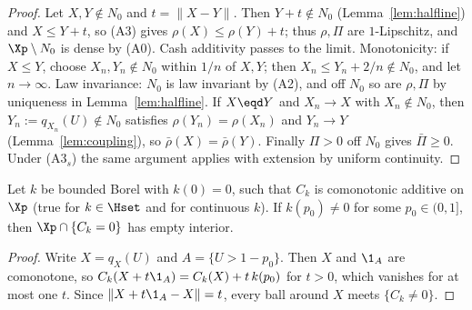 \begin{proof}
Let $X,Y\notin N_0$ and $t=\|X-Y\|$. Then $Y+t\notin N_0$ (Lemma~\ref{lem:halfline}) and $X\le Y+t$, so (A3) gives
$\rho(X)\le\rho(Y)+t$; thus $\rho,\Pi$ are $1$-Lipschitz, and $\Xp\setminus N_0$ is dense by (A0). Cash additivity
passes to the limit. Monotonicity: if $X\le Y$, choose $X_n,Y_n\notin N_0$ within $1/n$ of $X,Y$; then
$X_n\le Y_n+2/n\notin N_0$, and let $n\to\infty$. Law invariance: $N_0$ is law invariant by (A2), and off $N_0$ so are
$\rho,\Pi$ by uniqueness in Lemma~\ref{lem:halfline}. If $X\eqd Y$ and $X_n\to X$ with $X_n\notin N_0$, then
$Y_n:=q_{X_n}(U)\notin N_0$ satisfies $\rho(Y_n)=\rho(X_n)$ and $Y_n\to Y$ (Lemma~\ref{lem:coupling}), so
$\bar\rho(X)=\bar\rho(Y)$. Finally $\Pi>0$ off $N_0$ gives $\bar\Pi\ge0$. Under (A3$_s$) the same argument applies with
extension by uniform continuity. \qedhere
\end{proof}

\begin{lemma}[Sweep]\label{lem:sweep}
Let $k$ be bounded Borel with $k(0)=0$, such that $C_k$ is comonotonic additive on $\Xp$ (true for $k\in\Hset$ and
for continuous $k$). If $k(p_0)\ne0$ for some $p_0\in(0,1]$, then $\Xp\cap\{C_k=0\}$ has empty interior.
\end{lemma}

\begin{proof}
Write $X=q_X(U)$ and $A=\{U>1-p_0\}$. Then $X$ and $\1_A$ are comonotone, so $C_k(X+t\1_A)=C_k(X)+t\,k(p_0)$ for
$t>0$, which vanishes for at most one $t$. Since $\|X+t\1_A-X\|=t$, every ball around $X$ meets $\{C_k\ne0\}$. \qedhere
\end{proof}

